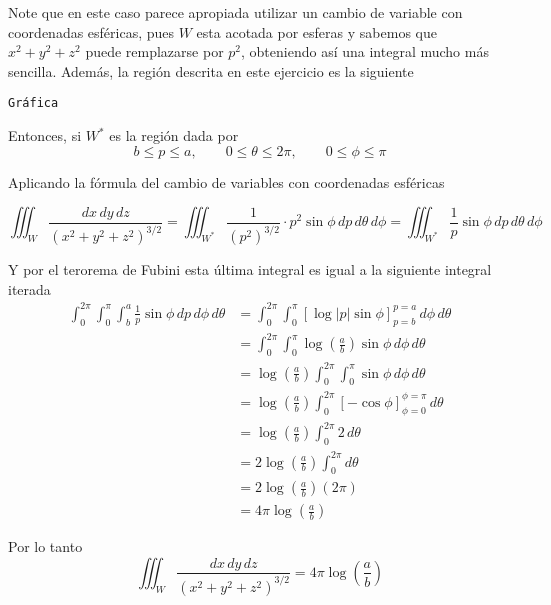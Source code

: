 Note que en este caso parece apropiada utilizar un cambio de variable con coordenadas esféricas, pues $W$ esta acotada por esferas y sabemos que $x^2 + y^2 + z^2$ puede remplazarse por $p^2$, obteniendo así una integral mucho más sencilla. Además, la región descrita en este ejercicio es la siguiente

\texttt{Gráfica}

Entonces, si $W^*$ es la región dada por
\[b \leq p \leq a, \qquad 0 \leq \theta \leq 2\pi, \qquad 0 \leq \phi \leq \pi\]

Aplicando la fórmula del cambio de variables con coordenadas esféricas

\[\iiint_W \frac{dx\, dy\, dz}{(x^2 + y^2 + z^2)^{3/2}}	= \iiint_{W^*} \frac{1}{(p^2)^{3/2}} \cdot p^2\sin\phi\, dp\, d\theta\, d\phi = \iiint_{W^*} \frac{1}{p} \sin \phi\, dp\, d\theta\, d\phi\]

Y por el terorema de Fubini esta última integral es igual a la siguiente integral iterada
\begin{align*}
	\int_{0}^{2\pi} \int_{0}^{\pi} \int_b^a\frac{1}{p} \sin\phi \, dp\, d\phi\, d\theta &= \int_{0}^{2\pi} \int_{0}^{\pi} \left[\log|p| \sin\phi\right]_{p=b}^{p=a} \, d\phi\, d\theta\\
	&= \int_{0}^{2\pi} \int_{0}^{\pi} \log\left(\frac{a}{b}\right) \sin\phi \, d\phi\, d\theta\\
	&= \log\left(\frac{a}{b}\right) \int_{0}^{2\pi} \int_{0}^{\pi} \sin\phi \, d\phi\, d\theta\\
	&= \log\left(\frac{a}{b}\right) \int_{0}^{2\pi} [-\cos\phi]_{\phi=0}^{\phi=\pi}\, d\theta\\
	&= \log\left(\frac{a}{b}\right) \int_{0}^{2\pi} 2\, d\theta\\
	&= 2\log\left(\frac{a}{b}\right) \int_{0}^{2\pi} d\theta\\
	&= 2\log\left(\frac{a}{b}\right) (2\pi)\\
	&= 4\pi\log\left(\frac{a}{b}\right)
\end{align*}

Por lo tanto
\[\iiint_W \frac{dx\, dy\, dz}{(x^2 + y^2 + z^2)^{3/2}} = 4\pi\log\left(\frac{a}{b}\right)\]